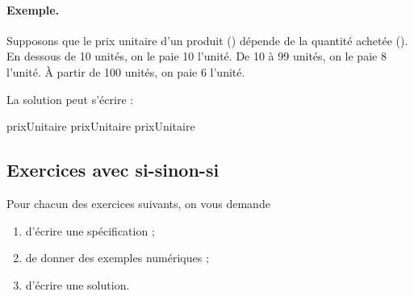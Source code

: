 	\begin{Emphase}
		\paragraph{Exemple.}
		Supposons que le prix unitaire d'un produit ()
		dépende de la quantité achetée (). 
		En dessous de 10 unités, on le paie 10\texteuro{} l'unité.
		De 10 à 99 unités, on le paie 8\texteuro{} l'unité.
		À partir de 100 unités, on paie 6\texteuro{} l'unité.
		
		La solution peut s'écrire :\\
			\begin{LDA}
					\Let prixUnitaire 
				 
					\Let prixUnitaire 
				\Else
					\Let prixUnitaire 
				\EndIf
			\end{LDA}
		
	\end{Emphase}
	
	\subsection{Exercices avec si-sinon-si}
	
		Pour chacun des exercices suivants,
		on vous demande
		\begin{enumerate}
		\item
			d'écrire une spécification ;
		\item
			de donner des exemples numériques ;
		\item
			d'écrire une solution.
		\end{enumerate}
		
